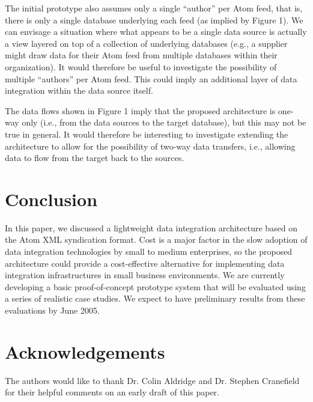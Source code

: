 \documentclass{CRPITStyle}
\begin{document}
The initial prototype also assumes only a single ``author'' per Atom feed,
that is, there is only a single database underlying each feed (as
implied by Figure 1). We can envisage a situation where what appears to
be a single data source is actually a view layered on top of a
collection of underlying databases (e.g., a supplier might draw data for
their Atom feed from multiple databases within their organization). It
would therefore be useful to investigate the possibility of multiple
``authors'' per Atom feed. This could imply an additional layer of data
integration within the data source itself.

The data flows shown in Figure 1 imply that the proposed architecture is
one-way only (i.e., from the data sources to the target database), but
this may not be true in general. It would therefore be interesting to
investigate extending the architecture to allow for the possibility of
two-way data transfers, i.e., allowing data to flow from the target back
to the sources.


\section{Conclusion}
\label{sec-conclusion}

In this paper, we discussed a lightweight data integration architecture
based on the Atom XML syndication format. Cost is a major factor in the
slow adoption of data integration technologies by small to medium
enterprises, so the proposed architecture could provide a cost-effective
alternative for implementing data integration infrastructures in small
business environments. We are currently developing a basic
proof-of-concept prototype system that will be evaluated using a series
of realistic case studies. We expect to have preliminary results from
these evaluations by June 2005.


\section*{Acknowledgements}
\label{sec-acknowledgements}

The authors would like to thank Dr. Colin Aldridge and Dr. Stephen
Cranefield for their helpful comments on an early draft of this paper.




\end{document}
